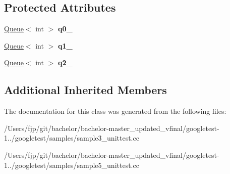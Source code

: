 \subsection*{Protected Attributes}
\begin{DoxyCompactItemize}
\item 
\mbox{\label{class_queue_test_a0eba1fe2b31d75abd2df688ca5245e22}} 
\mbox{\hyperlink{class_queue}{Queue}}$<$ int $>$ {\bfseries q0\+\_\+}
\item 
\mbox{\label{class_queue_test_a1e55594e71820ba0f1b09591fb328c30}} 
\mbox{\hyperlink{class_queue}{Queue}}$<$ int $>$ {\bfseries q1\+\_\+}
\item 
\mbox{\label{class_queue_test_aeb7a2e3f6ce2d97d84eb1e01468adc2f}} 
\mbox{\hyperlink{class_queue}{Queue}}$<$ int $>$ {\bfseries q2\+\_\+}
\end{DoxyCompactItemize}
\subsection*{Additional Inherited Members}


The documentation for this class was generated from the following files\+:\begin{DoxyCompactItemize}
\item 
/\+Users/fjp/git/bachelor/bachelor-\/master\+\_\+updated\+\_\+vfinal/googletest-\/1../googletest/samples/sample3\+\_\+unittest.\+cc\item 
/\+Users/fjp/git/bachelor/bachelor-\/master\+\_\+updated\+\_\+vfinal/googletest-\/1../googletest/samples/sample5\+\_\+unittest.\+cc\end{DoxyCompactItemize}
